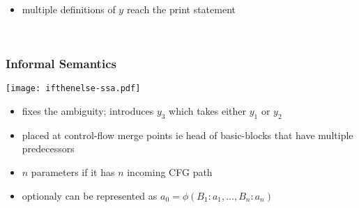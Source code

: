 \begin{frame}
{\begin{minipage}{0.5\textwidth}
\end{minipage}
\begin{itemize}
\item multiple definitions of $y$ reach the print statement
\end{itemize}
~\vspace{3cm}
}%
\end{frame}

\begin{frame}
\frametitle{Informal Semantics}
\texttt{[image: ifthenelse-ssa.pdf]}
\begin{minipage}[b]{0.5\textwidth}
\begin{itemize}
\item fixes the ambiguity; introduces $y_3$ which takes either $y_1$ or $y_2$
\item placed at control-flow merge points ie head of basic-blocks that have multiple predecessors
\end{itemize}
\end{minipage}
\begin{itemize}
\item $n$ parameters if it has $n$ incoming CFG path
\item optionaly can be represented as $a_0=\phi(B_1:a_1, \dots, B_n:a_n)$
\end{itemize}
\end{frame}

